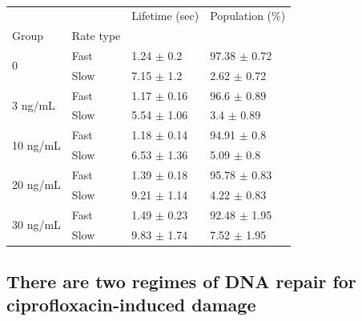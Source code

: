 \begin{table}[htbp]
    \centering
    \begin{tabular}{llll}
        \toprule
         &  & Lifetime (sec) & Population (\%) \\
        Group & Rate type &  &  \\
        \midrule
        \multirow[t]{2}{*}{0} & Fast & 1.24 $\pm$ 0.2 & 97.38 $\pm$ 0.72 \\
         & Slow & 7.15 $\pm$ 1.2 & 2.62 $\pm$ 0.72 \\
        \cline{1-4}
        \multirow[t]{2}{*}{3 ng/mL} & Fast & 1.17 $\pm$ 0.16 & 96.6 $\pm$ 0.89 \\
         & Slow & 5.54 $\pm$ 1.06 & 3.4 $\pm$ 0.89 \\
        \cline{1-4}
        \multirow[t]{2}{*}{10 ng/mL} & Fast & 1.18 $\pm$ 0.14 & 94.91 $\pm$ 0.8 \\
         & Slow & 6.53 $\pm$ 1.36 & 5.09 $\pm$ 0.8 \\
        \cline{1-4}
        \multirow[t]{2}{*}{20 ng/mL} & Fast & 1.39 $\pm$ 0.18 & 95.78 $\pm$ 0.83 \\
         & Slow & 9.21 $\pm$ 1.14 & 4.22 $\pm$ 0.83 \\
        \cline{1-4}
        \multirow[t]{2}{*}{30 ng/mL} & Fast & 1.49 $\pm$ 0.23 & 92.48 $\pm$ 1.95 \\
         & Slow & 9.83 $\pm$ 1.74 & 7.52 $\pm$ 1.95 \\
        \bottomrule
        \end{tabular}
    \caption{}
    \label{tab:fit_results}
\end{table}




\subsection*{There are two regimes of DNA repair for ciprofloxacin-induced damage}

